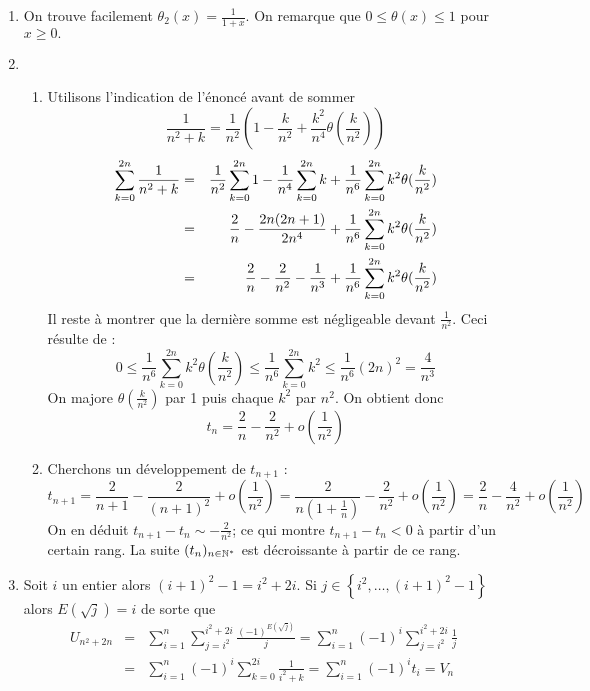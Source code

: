\begin{enumerate}
\item  On trouve facilement $\theta _{2}(x)=\frac{1}{1+x}$. On remarque que $%
0\leq \theta (x)\leq 1$ pour $x\geq 0.$
\item
\begin{enumerate}
\item  Utilisons l'indication de l'{\'e}nonc{\'e} avant de sommer
\[
\frac{1}{n^{2}+k}=\frac{1}{n^{2}}\left( 1-\frac{k}{n^{2}}+\frac{k^{2}}{n^{4}}%
\theta (\frac{k}{n^{2}})\right)
\]
\begin{eqnarray*}
\sum_{k=0}^{2n}\frac{1}{n^{2}+k} &=&\frac{1}{n^{2}}\sum_{k=0}^{2n}1-\frac{1}{%
n^{4}}\sum_{k=0}^{2n}k+\frac{1}{n^{6}}\sum_{k=0}^{2n}k^{2}\theta (\frac{k}{%
n^{2}})\\
&=&\frac{2}{n}-\frac{2n(2n+1)}{2n^{4}}+\frac{1}{n^{6}}%
\sum_{k=0}^{2n}k^{2}\theta (\frac{k}{n^{2}}) \\
&=&\frac{2}{n}-\frac{2}{n^{2}}-\frac{1}{n^{3}}+\frac{1}{n^{6}}%
\sum_{k=0}^{2n}k^{2}\theta (\frac{k}{n^{2}})
\end{eqnarray*}
Il reste {\`a} montrer que la derni{\`e}re somme est n{\'e}gligeable devant $%
\frac{1}{n^{2}}$. Ceci r{\'e}sulte de :
\[
0\leq \frac{1}{n^{6}}\sum_{k=0}^{2n}k^{2}\theta (\frac{k}{n^{2}})\leq \frac{1%
}{n^{6}}\sum_{k=0}^{2n}k^{2}\leq
\frac{1}{n^{6}}(2n)^{2}=\frac{4}{n^{3}}
\]
On majore $\theta (\frac{k}{n^{2}})$ par 1 puis chaque $k^{2}$ par
$n^{2}$. On obtient donc
\[
t_{n}=\frac{2}{n}-\frac{2}{n^{2}}+o(\frac{1}{n^{2}})
\]

\item Cherchons un d{\'e}veloppement de $t_{n+1}$ :
\[
t_{n+1}=\frac{2}{n+1}-\frac{2}{(n+1)^{2}}+o(\frac{1}{n^{2}})=\frac{2}{n(1+%
\frac{1}{n})}-\frac{2}{n^{2}}+o(\frac{1}{n^{2}})=\frac{2}{n}-\frac{4}{n^{2}}%
+o(\frac{1}{n^{2}})
\]
On en d{\'e}duit $t_{n+1}-t_{n}\sim -\frac{2}{n^{2}}$; ce qui montre $%
t_{n+1}-t_{n}<0$ {\`a} partir d'un certain rang. La suite
$(t_{n})_{n\in \mathbb{N}^{*}}$ est d{\'e}croissante {\`a} partir de ce rang.
\end{enumerate}

\item  Soit $i$ un entier alors $(i+1)^{2}-1=i^{2}+2i$. Si $j\in \left\{
i^{2},\ldots ,(i+1)^{2}-1\right\} $ alors $E(\sqrt{j})=i$ de sorte
que
\begin{eqnarray*}
U_{n^{2}+2n}&=&\sum_{i=1}^{n}\sum_{j=i^{2}}^{i^{2}+2i}\frac{(-1)^{E(\sqrt{j})}}{j}
=\sum_{i=1}^{n}(-1)^{i}\sum_{j=i^{2}}^{i^{2}+2i}\frac{1}{j}\\
&=&\sum_{i=1}^{n}(-1)^{i}\sum_{k=0}^{2i}\frac{1}{i^{2}+k}=\sum_{i=1}^{n}(-1)^{i}t_{i}=V_{n}
\end{eqnarray*}


\end{enumerate}
